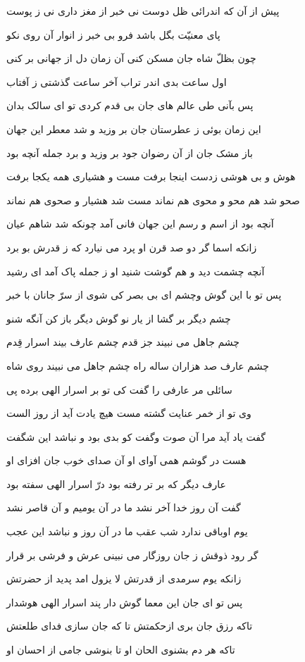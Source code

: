 پيش از آن که اندرائى ظل دوست
نى خبر از مغز دارى نى ز پوست

پاى معنيّت بگل باشد فرو
بى خبر ز انوار آن روى نکو

چون بظلّ شاه جان مسکن کنى
آن زمان دل از جهانى بر کنى

اول ساعت بدى اندر تراب
آخر ساعت گذشتى ز آفتاب

پس بآنى طى عالم هاى جان
بى قدم کردى تو اى سالک بدان

اين زمان بوئى ز عطرستان جان
بر وزيد و شد معطر اين جهان

باز مشک جان از آن رضوان جود
بر وزيد و برد جمله آنچه بود

هوش و بى هوشى زدست اينجا برفت
مست و هشيارى همه يکجا برفت

صحو شد هم محو و محوى هم نماند
مست شد هشيار و صحوى هم نماند

آنچه بود از اسم و رسم اين جهان
فانى آمد چونکه شد شاهم عيان

زانکه اسما گر دو صد قرن او پرد
مى نيارد که ز قدرش بو برد

آنچه چشمت ديد و هم گوشت شنيد
او ز جمله پاک آمد اى رشيد

پس تو با اين گوش وچشم اى بى بصر
کى شوى از سرّ جانان با خبر

چشم ديگر بر گشا از يار نو
گوش ديگر باز کن آنگه شنو

چشم جاهل مى نبيند جز قدم
چشم عارف بيند اسرار قِدم

چشم عارف صد هزاران ساله راه
چشم جاهل مى نبيند روى شاه

سائلی مر عارفى را گفت کى
تو بر اسرار الهى برده پى

وى تو از خمر عنايت گشته مست
هيچ يادت آيد از روز الست

گفت ياد آيد مرا آن صوت وگفت
کو بدى بود و نباشد اين شگفت

هست در گوشم همى آواى او
آن صداى خوب جان افزاى او

عارف ديگر که بر تر رفته بود
درّ اسرار الهى سفته بود

گفت آن روز خدا آخر نشد
ما در آن يوميم و آن قاصر نشد

يوم اوباقى ندارد شب عقب
ما در آن روز و نباشد اين عجب

گر رود ذوقش ز جان روزگار
مى نبينى عرش و فرشى بر قرار

زانکه يوم سرمدى از قدرتش
لا يزول امد پديد از حضرتش

پس تو اى جان اين معما گوش دار
پند اسرار الهى هوشدار

تاکه رزق جان برى ازحکمتش
تا که جان سازى فداى طلعتش

تاکه هر دم بشنوى الحان او
تا بنوشى جامى از احسان او

